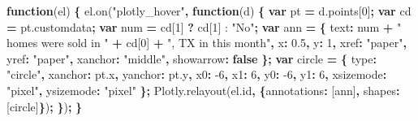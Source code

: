 \documentclass[
  12pt,
]{krantz}
\newenvironment{Shaded}{\begin{snugshade}}{\end{snugshade}}
\newcommand{\AttributeTok}[1]{\textcolor[rgb]{0.77,0.63,0.00}{#1}}
\newcommand{\DataTypeTok}[1]{\textcolor[rgb]{0.13,0.29,0.53}{#1}}
\newcommand{\DecValTok}[1]{\textcolor[rgb]{0.00,0.00,0.81}{#1}}
\newcommand{\FloatTok}[1]{\textcolor[rgb]{0.00,0.00,0.81}{#1}}
\newcommand{\KeywordTok}[1]{\textcolor[rgb]{0.13,0.29,0.53}{\textbf{#1}}}
\newcommand{\NormalTok}[1]{#1}
\newcommand{\OperatorTok}[1]{\textcolor[rgb]{0.81,0.36,0.00}{\textbf{#1}}}
\newcommand{\StringTok}[1]{\textcolor[rgb]{0.31,0.60,0.02}{#1}}
\newcommand{\VariableTok}[1]{\textcolor[rgb]{0.00,0.00,0.00}{#1}}
\begin{document}
\begin{Shaded}
\begin{Highlighting}[]
\KeywordTok{function}\NormalTok{(el) }\OperatorTok{\{}
  \VariableTok{el}\NormalTok{.}\AttributeTok{on}\NormalTok{(}\StringTok{"plotly_hover"}\OperatorTok{,} \KeywordTok{function}\NormalTok{(d) }\OperatorTok{\{}
    \KeywordTok{var}\NormalTok{ pt }\OperatorTok{=} \VariableTok{d}\NormalTok{.}\AttributeTok{points}\NormalTok{[}\DecValTok{0}\NormalTok{]}\OperatorTok{;}
    \KeywordTok{var}\NormalTok{ cd }\OperatorTok{=} \VariableTok{pt}\NormalTok{.}\AttributeTok{customdata}\OperatorTok{;}
    \KeywordTok{var}\NormalTok{ num }\OperatorTok{=}\NormalTok{ cd[}\DecValTok{1}\NormalTok{] }\OperatorTok{?}\NormalTok{ cd[}\DecValTok{1}\NormalTok{] : }\StringTok{"No"}\OperatorTok{;}
    \KeywordTok{var}\NormalTok{ ann }\OperatorTok{=} \OperatorTok{\{}
      \DataTypeTok{text}\OperatorTok{:}\NormalTok{ num }\OperatorTok{+} \StringTok{" homes were sold in "} \OperatorTok{+}\NormalTok{ cd[}\DecValTok{0}\NormalTok{] }\OperatorTok{+} \StringTok{", TX in this month"}\OperatorTok{,}
      \DataTypeTok{x}\OperatorTok{:} \FloatTok{0.5}\OperatorTok{,}
      \DataTypeTok{y}\OperatorTok{:} \DecValTok{1}\OperatorTok{,}
      \DataTypeTok{xref}\OperatorTok{:} \StringTok{"paper"}\OperatorTok{,}
      \DataTypeTok{yref}\OperatorTok{:} \StringTok{"paper"}\OperatorTok{,}
      \DataTypeTok{xanchor}\OperatorTok{:} \StringTok{"middle"}\OperatorTok{,}
      \DataTypeTok{showarrow}\OperatorTok{:} \KeywordTok{false}
    \OperatorTok{\};}
    \KeywordTok{var}\NormalTok{ circle }\OperatorTok{=} \OperatorTok{\{}
      \DataTypeTok{type}\OperatorTok{:} \StringTok{"circle"}\OperatorTok{,}
      \DataTypeTok{xanchor}\OperatorTok{:} \VariableTok{pt}\NormalTok{.}\AttributeTok{x}\OperatorTok{,}
      \DataTypeTok{yanchor}\OperatorTok{:} \VariableTok{pt}\NormalTok{.}\AttributeTok{y}\OperatorTok{,}
      \DataTypeTok{x0}\OperatorTok{:} \DecValTok{-6}\OperatorTok{,}
      \DataTypeTok{x1}\OperatorTok{:} \DecValTok{6}\OperatorTok{,}
      \DataTypeTok{y0}\OperatorTok{:} \DecValTok{-6}\OperatorTok{,}
      \DataTypeTok{y1}\OperatorTok{:} \DecValTok{6}\OperatorTok{,}
      \DataTypeTok{xsizemode}\OperatorTok{:} \StringTok{"pixel"}\OperatorTok{,}
      \DataTypeTok{ysizemode}\OperatorTok{:} \StringTok{"pixel"}
    \OperatorTok{\};}
    \VariableTok{Plotly}\NormalTok{.}\AttributeTok{relayout}\NormalTok{(}\VariableTok{el}\NormalTok{.}\AttributeTok{id}\OperatorTok{,} \OperatorTok{\{}\DataTypeTok{annotations}\OperatorTok{:}\NormalTok{ [ann]}\OperatorTok{,} \DataTypeTok{shapes}\OperatorTok{:}\NormalTok{ [circle]}\OperatorTok{\}}\NormalTok{)}\OperatorTok{;}
  \OperatorTok{\}}\NormalTok{)}\OperatorTok{;}
\OperatorTok{\}}
\end{Highlighting}
\end{Shaded}
\end{document}
